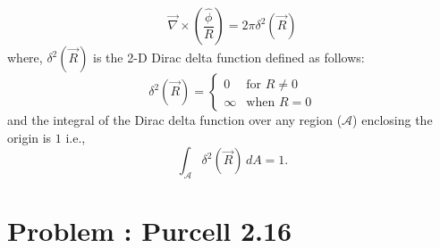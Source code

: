 \documentclass[solutions]{esg8022pset}
\newcommand{\Kgrad}{\left(\hat{x} \frac{\partial}{\partial x} + \hat{y} \frac{\partial}{\partial y} + \hat{z} \frac{\partial}{\partial z}\right)}
\newcommand{\KKdiv}[6]{{#4}\left(\frac{\partial}{\partial x}{#1} {#5} \frac{\partial}{\partial y}{#2} {#6}\frac{\partial}{\partial z}{#3} \right)}
\newcommand{\dtheta}{\frac{\partial}{\partial \theta}}
\newcommand{\dr}{\frac{\partial}{\partial r}}
\begin{document}
\begin{enumerate}[(a)]
\begin{enumerate}[(i)]
          $${\vec{\nabla} \times \left( \frac{ \hat\phi}{R} \right)} = 2\pi \delta^2(\vec{R}) $$
          where, $\delta^2(\vec{R})$ is the 2-D Dirac delta function defined as follows:
          $$ \delta^2(\vec{R}) = \begin{cases} 0 & \text{for }R \neq  0 \\ \infty & \text{when }R = 0 \end{cases}$$
          and the integral of the Dirac delta function over any region ($\mathcal A$) enclosing the origin is $1$ i.e.,
          $$\int_{\mathcal A}\delta^2(\vec{R})\,dA = 1.$$
      \end{enumerate}
  \end{enumerate}
\section{Problem \thesection: Purcell 2.16}
\end{document}
